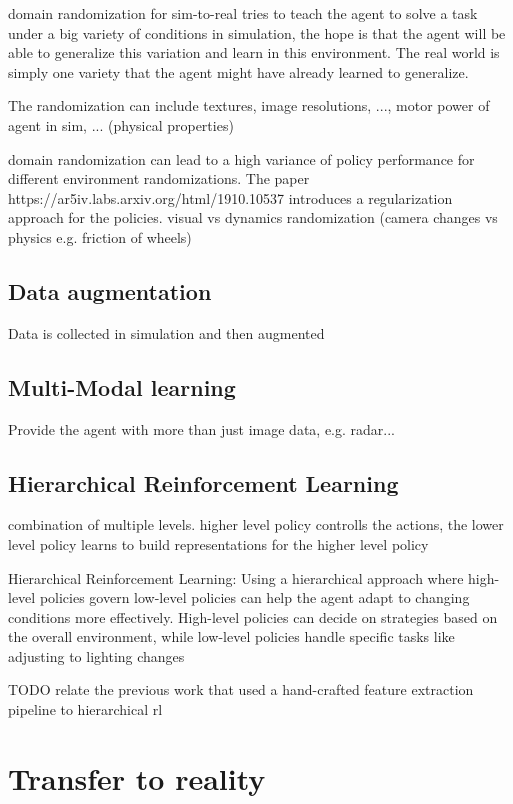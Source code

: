 domain randomization for sim-to-real tries to teach the agent to solve a task under a big variety of conditions in simulation, the hope is that the agent will be able to generalize this variation and learn in this environment.
The real world is simply one variety that the agent might have already learned to generalize.

The randomization can include textures, image resolutions, ..., motor power of agent in sim, ... (physical properties)


domain randomization can lead to a high variance of policy performance for different environment randomizations. The paper https://ar5iv.labs.arxiv.org/html/1910.10537 introduces a regularization approach for the policies.
visual vs dynamics randomization (camera changes vs physics e.g. friction of wheels)

\subsection{Data augmentation}

Data is collected in simulation and then augmented


\subsection{Multi-Modal learning}

Provide the agent with more than just image data,  e.g. radar...


\subsection{Hierarchical Reinforcement Learning}

combination of multiple levels. higher level policy controlls the actions, the lower level policy learns to build representations for the higher level policy

Hierarchical Reinforcement Learning: Using a hierarchical approach where high-level policies govern low-level policies can help the agent adapt to changing conditions more effectively. High-level policies can decide on strategies based on the overall environment, while low-level policies handle specific tasks like adjusting to lighting changes


TODO relate the previous work that used a hand-crafted feature extraction pipeline to hierarchical rl

\section{Transfer to reality}

